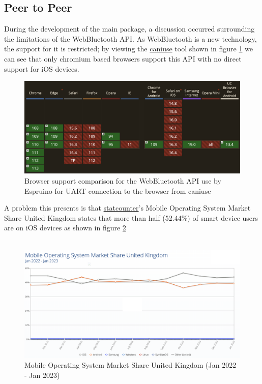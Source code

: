 \documentclass{l4proj}
\begin{document}
\subsection{Peer to Peer}
\text During the development of the main package, a discussion occurred surrounding the limitations of the WebBluetooth API. As WebBluetooth is a new technology, the support for it is restricted; by viewing the \href{https://caniuse.com/?search=WebBluetooth}{caniuse} tool shown in figure \ref{fig:caniuse_webblue} we can see that only chromium based browsers support this API with no direct support for iOS devices.

\begin{figure}[!ht]
    \centering
    \includegraphics[width=12cm]{dissertation/images/caniuse_webbluetooth.png}
    \caption{Browser support comparison for the WebBluetooth API use by Espruino for UART connection to the browser from caniuse}
    \label{fig:caniuse_webblue}
\end{figure}

A problem this presents is that \href{https://gs.statcounter.com/os-market-share/mobile/united-kingdom}{statcounter}'s Mobile Operating System Market Share United Kingdom states that more than half (52.44\%) of smart device users are on iOS devices as shown in figure \ref{fig:smartdeviceusage}\\\\

\begin{figure}[!ht]
    \centering
    \includegraphics[width=12cm]{dissertation/images/mobile-operating-system-usage.png}
    \caption{Mobile Operating System Market Share United Kingdom (Jan 2022 - Jan 2023)}
    \label{fig:smartdeviceusage}
\end{figure}
\end{document}
